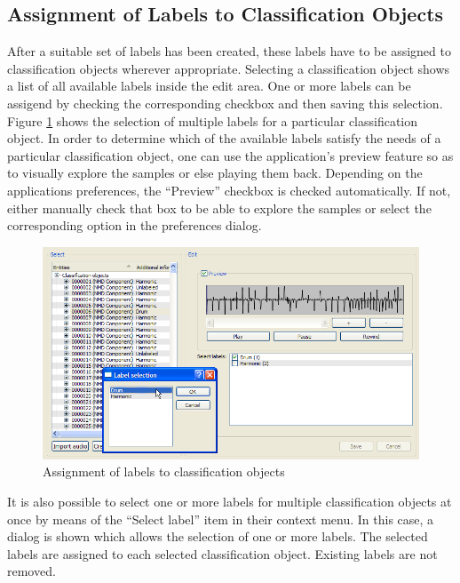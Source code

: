 \subsection{Assignment of Labels to Classification Objects}

After a suitable set of labels has been created, these labels have to be
assigned to classification objects wherever appropriate. Selecting a
classification object shows a list of all available labels inside the edit
area. One or more labels can be assigend by checking the corresponding checkbox
and then saving this selection. Figure \ref{figure:LabelAssignment} shows the
selection of multiple labels for a particular classification object.  In order
to determine which of the available labels satisfy the needs of a particular
classification object, one can use the application's preview feature so as to
visually explore the samples or else playing them back. Depending on the
applications preferences, the ``Preview'' checkbox is checked automatically. If
not, either manually check that box to be able to explore the samples or select
the corresponding option in the preferences dialog.

\begin{figure}
    \includegraphics[width=\textwidth]{images/LabelAssignment.png}
    \caption{%
        \label{figure:LabelAssignment}%
        Assignment of labels to classification objects
    }
\end{figure}

It is also possible to select one or more labels for multiple classification
objects at once by means of the ``Select label'' item in their context menu. In
this case, a dialog is shown which allows the selection of one or more
labels. The selected labels are assigned to each selected classification
object. Existing labels are not removed.


